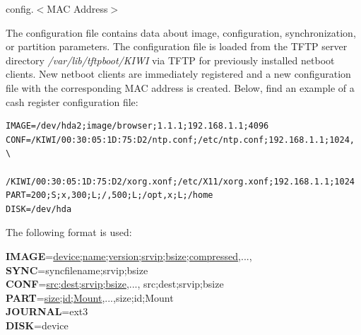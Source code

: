 \begin{Command}{8cm}
	config.$<$MAC Address$>$
\end{Command}

The configuration file contains data about image, configuration,
synchronization, or partition parameters. The configuration file is
loaded from the TFTP server directory \textit{/var/lib/tftpboot/KIWI} via TFTP
for previously installed netboot clients. New netboot clients are
immediately registered and a new configuration file with the
corresponding MAC address is created. Below, find an example of a cash
register configuration file:

\begin{verbatim}
IMAGE=/dev/hda2;image/browser;1.1.1;192.168.1.1;4096
CONF=/KIWI/00:30:05:1D:75:D2/ntp.conf;/etc/ntp.conf;192.168.1.1;1024,     \
     /KIWI/00:30:05:1D:75:D2/xorg.xonf;/etc/X11/xorg.xonf;192.168.1.1;1024
PART=200;S;x,300;L;/,500;L;/opt,x;L;/home
DISK=/dev/hda
\end{verbatim}

The following format is used:

\begin{Command}{14cm}
	\textbf{IMAGE}=\underline{device;name;version;srvip;bsize;compressed},...,\\
	\textbf{SYNC}=syncfilename;srvip;bsize\\
	\textbf{CONF}=\underline{src;dest;srvip;bsize},...,
                             src;dest;srvip;bsize\\
	\textbf{PART}=\underline{size;id;Mount},...,size;id;Mount\\
	\textbf{JOURNAL}=ext3\\
	\textbf{DISK}=device
\end{Command}

